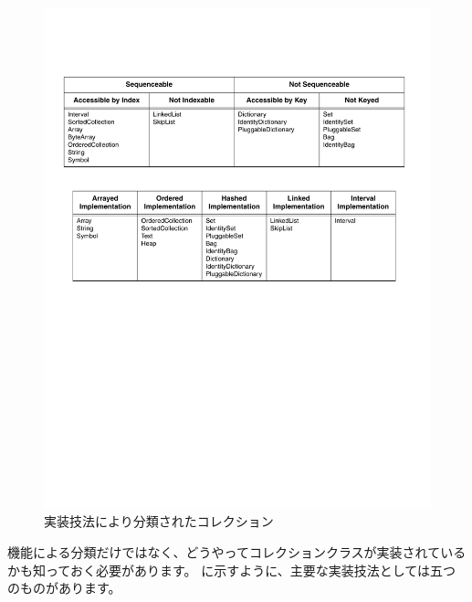 \documentclass[a4paper,10pt,twoside]{book}
\begin{document}
\begin{figure}
\begin{center}
\includegraphics[width=\textwidth]{CollectionsByImpl}
\caption{実装技法により分類されたコレクション%
    }
\end{center}
\end{figure}

機能による分類だけではなく、どうやってコレクションクラスが実装されているかも知っておく必要があります。 に示すように、主要な実装技法としては五つのものがあります。
\end{document}
